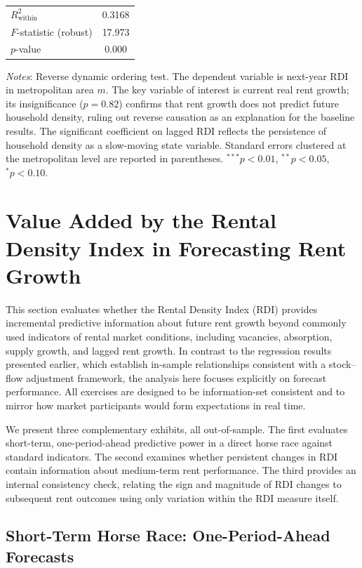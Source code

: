 \documentclass[pdflatex,sn-apa]{sn-jnl}%
\theoremstyle{thmstyleone}%
\theoremstyle{thmstyletwo}%
\theoremstyle{thmstylethree}%
\begin{document}
\begin{table}[htbp]
\begin{tabular}{lc}
$R^2_{\text{within}}$                   & 0.3168 \\
$F$-statistic (robust)                  & 17.973 \\
$p$-value                               & 0.000 \\
\bottomrule
\end{tabular}
\begin{flushleft}
\footnotesize
\textit{Notes}: Reverse dynamic ordering test. The dependent variable is 
next-year RDI in metropolitan area $m$. The key variable of interest is current 
real rent growth; its insignificance ($p = 0.82$) confirms that rent growth does 
not predict future household density, ruling out reverse causation as an 
explanation for the baseline results. The significant coefficient on lagged RDI 
reflects the persistence of household density as a slow-moving state variable. 
Standard errors clustered at the metropolitan level are reported in parentheses. 
$^{***}p<0.01$, $^{**}p<0.05$, $^{*}p<0.10$.
\end{flushleft}
\end{table}
\section{Value Added by the Rental Density Index in Forecasting Rent Growth}\label{section5}

This section evaluates whether the Rental Density Index (RDI) provides incremental predictive information about future rent growth beyond commonly used indicators of rental market conditions, including vacancies, absorption, supply growth, and lagged rent growth. In contrast to the regression results presented earlier, which establish in-sample relationships consistent with a stock–flow adjustment framework, the analysis here focuses explicitly on forecast performance. All exercises are designed to be information-set consistent and to mirror how market participants would form expectations in real time.

We present three complementary exhibits, all out-of-sample. The first evaluates short-term, one-period-ahead predictive power in a direct horse race against standard indicators. The second examines whether persistent changes in RDI contain information about medium-term rent performance. The third provides an internal consistency check, relating the sign and magnitude of RDI changes to subsequent rent outcomes using only variation within the RDI measure itself.
\subsection{Short-Term Horse Race: One-Period-Ahead Forecasts}
\end{document}
